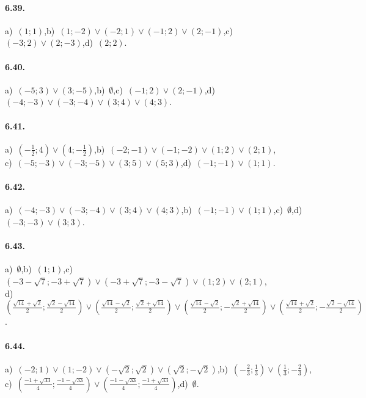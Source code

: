 \paragraph{6.39.} a)~$(1;1)$,\quad b)~$(1;-2)\vee(-2;1)\vee(-1;2)\vee(2;-1)$,\quad c)~$(-3;2)\vee(2;-3)$,\quad d)~$(2;2)$.

\paragraph{6.40.} a)~$(-5;3)\vee(3;-5)$,\quad b)~$\emptyset$,\quad c)~$(-1;2)\vee(2;-1)$,\quad d)~$(-4;-3)\vee(-3;-4)\vee(3;4)\vee(4;3)$.

\paragraph{6.41.} a)~$\left(-\frac 1 2;4\right)\vee\left(4;-\frac 1 2\right)$,\quad b)~$(-2;-1)\vee(-1;-2)\vee(1;2)\vee(2;1)$,\protect\\ c)~$(-5;-3)\vee(-3;-5)\vee(3;5)\vee(5;3)$,\quad d)~$(-1;-1)\vee(1;1)$.

\paragraph{6.42.} a)~$(-4;-3)\vee(-3;-4)\vee(3;4)\vee(4;3)$,\quad b)~$(-1;-1)\vee(1;1)$,\quad c)~$\emptyset$,\quad d)~$(-3;-3)\vee(3;3)$.

\paragraph{6.43.} a)~$\emptyset$,\quad b)~$(1;1)$,\quad c)~$(-3-\sqrt 7;-3+\sqrt 7)\vee(-3+\sqrt 7;-3-\sqrt 7)\vee(1;2)\vee(2;1)$,\protect\\
\quad d)~$\left(\frac{\sqrt{14}+\sqrt 2} 2;\frac{\sqrt 2-\sqrt{14}} 2\right)\vee\left(\frac{\sqrt{14}-\sqrt 2} 2;\frac{\sqrt 2+\sqrt{14}} 2\right)\vee\left(\frac{\sqrt{14}-\sqrt 2} 2;-\frac{\sqrt 2+\sqrt{14}} 2\right)\vee\left(\frac{\sqrt{14}+\sqrt 2} 2;-\frac{\sqrt 2-\sqrt{14}} 2\right)$.

\paragraph{6.44.} a)~$(-2;1)\vee(1;-2)\vee(-\sqrt {2};\sqrt{2})\vee(\sqrt {2};-\sqrt{2})$,\quad b)~$\left(-\frac 2 3;\frac 1 3\right)\vee\left(\frac 1 3;-\frac 2 3\right)$,\protect\\
\quad c)~$\left(\frac{-1+\sqrt{33}} 4;\frac{-1-\sqrt{33}} 4\right)\vee \left(\frac{-1-\sqrt{33}} 4;\frac{-1+\sqrt{33}} 4\right)$,\quad d)~$\emptyset$.


